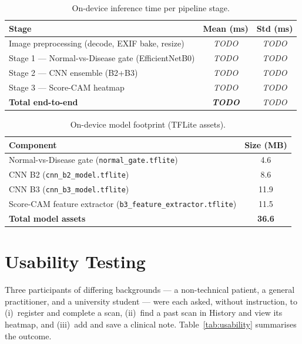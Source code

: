 \begin{table}[H]
\centering
\caption{On-device inference time per pipeline stage.}
\label{tab:inference_time}
\begin{tabular}{|l|c|c|}
\hline
\textbf{Stage} & \textbf{Mean (ms)} & \textbf{Std (ms)} \\ \hline
Image preprocessing (decode, EXIF bake, resize) & \textit{TODO} & \textit{TODO} \\ \hline
Stage 1 — Normal-vs-Disease gate (EfficientNetB0) & \textit{TODO} & \textit{TODO} \\ \hline
Stage 2 — CNN ensemble (B2+B3) & \textit{TODO} & \textit{TODO} \\ \hline
Stage 3 — Score-CAM heatmap & \textit{TODO} & \textit{TODO} \\ \hline
\textbf{Total end-to-end} & \textbf{\textit{TODO}} & \textit{TODO} \\ \hline
\end{tabular}
\end{table}


\begin{table}[H]
\centering
\caption{On-device model footprint (TFLite assets).}
\label{tab:storage}
\begin{tabular}{|l|c|}
\hline
\textbf{Component} & \textbf{Size (MB)} \\ \hline
Normal-vs-Disease gate (\texttt{normal\_gate.tflite}) & 4.6 \\ \hline
CNN B2 (\texttt{cnn\_b2\_model.tflite})                & 8.6 \\ \hline
CNN B3 (\texttt{cnn\_b3\_model.tflite})                & 11.9 \\ \hline
Score-CAM feature extractor (\texttt{b3\_feature\_extractor.tflite}) & 11.5 \\ \hline
\textbf{Total model assets} & \textbf{36.6} \\ \hline
\end{tabular}
\end{table}

\section{Usability Testing}

Three participants of differing backgrounds — a non-technical patient, a general
practitioner, and a university student — were each asked, without instruction,
to (i)~register and complete a scan, (ii)~find a past scan in History and view
its heatmap, and (iii)~add and save a clinical note.
Table~\ref{tab:usability} summarises the outcome.

